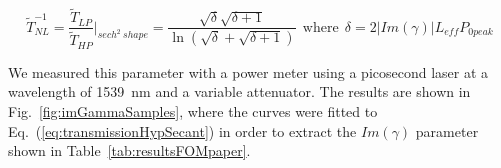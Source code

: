 




\begin{equation}
\tilde{T}_{NL}^{-1} = \frac{\tilde{T}_{LP}}{\tilde{T}_{HP}} \bigg|_{sech^2~shape}  = \frac{\sqrt{\delta}\sqrt{\delta + 1}}{\ln(\sqrt{\delta}+\sqrt{\delta+1})} ~~\mathrm{where}~~  \delta = 2|Im(\gamma)| L_{eff} P_{0 peak}
\label{eq:transmissionHypSecant}
\end{equation}



We measured this parameter with a power meter using a picosecond laser at a wavelength of 1539~nm and a variable attenuator.
The results are shown in Fig.~\ref{fig:imGammaSamples}, where the curves were fitted to Eq.~(\ref{eq:transmissionHypSecant}) in order to extract the $Im(\gamma)$ parameter shown in Table~\ref{tab:resultsFOMpaper}.





